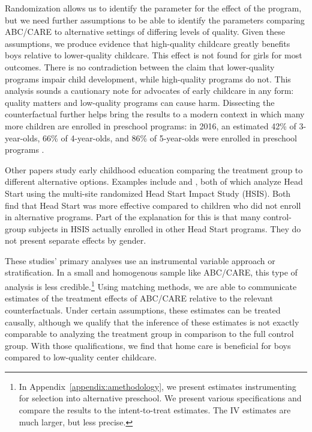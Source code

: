 Randomization allows us to identify the parameter for the effect of the program, but we need further assumptions to be able to identify the parameters comparing ABC/CARE to alternative settings of differing levels of quality. Given these assumptions, we produce evidence that high-quality childcare greatly benefits boys relative to lower-quality childcare. This effect is not found for girls for most outcomes. There is no contradiction between the claim that lower-quality programs impair child development, while high-quality programs do not. This analysis sounds a cautionary note for advocates of early childcare in any form: quality matters and low-quality programs can cause harm. Dissecting the counterfactual further helps bring the results to a modern context in which many more children are enrolled in preschool programs: in 2016, an estimated 42\% of 3-year-olds, 66\% of 4-year-olds, and 86\% of 5-year-olds were enrolled in preschool programs \citep{NCES_2017_Education_IES}.

Other papers study early childhood education comparing the treatment group to different alternative options. Examples include \citet{Feller_Grindal_etal_2016_ComparedtoWhat} and \citet{Kline_Walters_2016_QJE}, both of which analyze Head Start using the multi-site randomized Head Start Impact Study (HSIS). Both find that Head Start was more effective compared to children who did not enroll in alternative programs. Part of the explanation for this is that many control-group subjects in HSIS actually enrolled in other Head Start programs. They do not present separate effects by gender. 

These studies' primary analyses use an instrumental variable approach or stratification. In a small and homogenous sample like ABC/CARE, this type of analysis is less credible.\footnote{In Appendix~\ref{appendix:amethodology}, we present estimates instrumenting for selection into alternative preschool. We present various specifications and compare the results to the intent-to-treat estimates. The IV estimates are much larger, but less precise.} Using matching methods, we are able to communicate estimates of the treatment effects of ABC/CARE relative to the relevant counterfactuals. Under certain assumptions, these estimates can be treated causally, although we qualify that the inference of these estimates is not exactly comparable to analyzing the treatment group in comparison to the full control group. With those qualifications, we find that home care is beneficial for boys compared to low-quality center childcare. 

